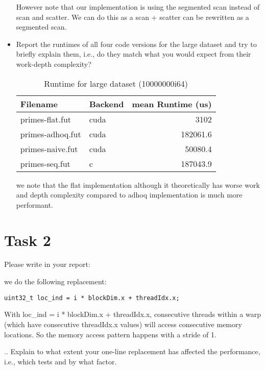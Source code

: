 \documentclass{article}
\begin{document}
\begin{itemize}
  However note that our implementation is using the segmented scan instead of scan and scatter. 
  We can do this as a scan + scatter can be rewritten as a segmented scan.


  \item Report the runtimes of all four code versions for the large dataset and try to briefly explain them, i.e., do they match what you would expect from their work-depth complexity?

  \begin{table}[h]
    \centering
    \begin{tabular}{|l|l|r|}
    \hline
    \textbf{Filename} & \textbf{Backend} & \textbf{mean Runtime (us)} \\
    \hline
    primes-flat.fut & cuda & 3102 \\
    primes-adhoq.fut & cuda & 182061.6 \\
    primes-naive.fut & cuda & 50080.4 \\
    primes-seq.fut & c & 187043.9 \\
    \hline
    \end{tabular}
    \caption{Runtime for large dataset (10000000i64)}
    \label{tab:runtime_comparison}
  \end{table}

  we note that the flat implementation although it theoretically has worse work and depth complexity compared to adhoq implementation is much more
  performant. 

\end{itemize}

\section{Task 2}

Please write in your report:


  we do the following replacement:
  \begin{lstlisting}[language=cuda]
    uint32_t loc_ind = i * blockDim.x + threadIdx.x;
  \end{lstlisting}

  With loc\_ind = i * blockDim.x + threadIdx.x, consecutive threads within a warp (which have consecutive threadIdx.x values) will access consecutive memory locations.
  So the memory access pattern happens with a stride of 1.

  .. Explain to what extent your one-line replacement has affected the performance, i.e., which tests and by what factor.
  
\end{document}
